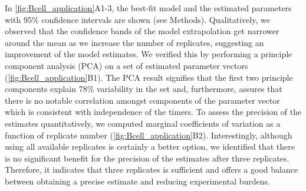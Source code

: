 \documentclass[11pt, a4paper]{article}
\begin{document}
In \cref{fig:Bcell_application}A1-3, the best-fit model and the estimated parameters with 95\% confidence intervals are shown (see Methods). Qualitatively, we observed that the confidence bands of the model extrapolation get narrower around the mean as we increase the number of replicates, suggesting an improvement of the model estimates. We verified this by performing a principle component analysis (PCA) on a set of estimated parameter vectors (\cref{fig:Bcell_application}B1). The PCA result signifies that the first two principle components explain 78\% variability in the set and, furthermore, assures that there is no notable correlation amongst components of the parameter vector which is consistent with independence of the timers. To assess the precision of the estimates quantitatively, we computed marginal coefficients of variation as a function of replicate number (\cref{fig:Bcell_application}B2). Interestingly, although using all available replicates is certainly a better option, we identified that there is no significant benefit for the precision of the estimates after three replicates. Therefore, it indicates that three replicates is sufficient and offers a good balance between obtaining a precise estimate and reducing experimental burdens.
\end{document}
